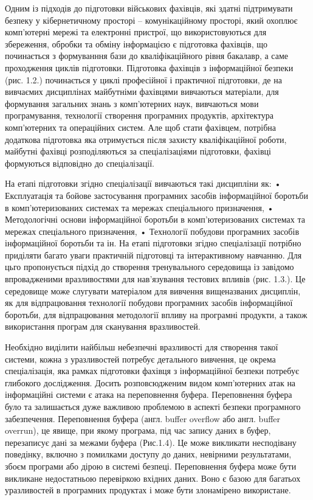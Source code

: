 \documentclass[oneside,final,14pt]{extreport}
\begin{document}
Одним із підходів до підготовки військових фахівців, які здатні підтримувати безпеку у кібернетичному просторі – комунікаційному просторі, який охоплює комп’ютерні мережі та електронні пристрої, що використовуються для збереження, обробки та обміну інформацією є підготовка фахівців, що починається з формуванння бази до кваліфікаційного рівня бакалавр, а саме проходження циклів підготовки.
Підготовка фахівців з інформаційної безпеки (рис. 1.2.) починається у циклі професійної і практичної підготовки, де на вивчаємих дисциплінах майбутніми фахівцями вивчаються матеріали, для формування загальних знань з комп’ютерних наук, вивчаються мови програмування, технології створення програмних продуктів, архітектура комп’ютерних та операційних  систем. Але щоб стати фахівцем, потрібна додаткова підготовка яка отримується після захисту кваліфікаційної роботи, майбутні фахівці розподіляються за спеціалізаціями підготовки, фахівці формуються відповідно до спеціалізації.

На етапі підготовки згідно спеціалізації вивчаються такі дисципліни як:
•   Експлуатація та бойове застосування програмних засобів інформаційної боротьби в комп’ютеризованих системах та мережах спеціального призначення,
•    Методологічні основи інформаційної боротьби в комп’ютеризованих системах та мережах спеціального призначення,
•   Технології побудови програмних засобів інформаційної боротьби та ін.
На етапі підготовки згідно спеціалізації потрібно приділяти багато уваги практичній підготовці та інтерактивному навчанню. Для цьго пропонується підхід до створення тренувального середовища із завідомо впровадженими вразливостями для нав’язування тестових впливів (рис. 1.3.). Це середовище може слугувати матеріалом для вивчення вищеназваних дисциплін, як для відпрацювання технології побудови програмних засобів інформаційної боротьби,  для відпрацювання методології впливу на програмні продукти, а також використання програм для сканування вразливостей.

Необхідно виділити найбільш небезпечні вразливості для створення такої системи, кожна з уразливостей потребує детального вивчення, це окрема спеціалізація,  яка рамках підготовки фахівця з інформаційної безпеки потребує глибокого дослідження.
Досить розповсюдженим видом комп'ютерних атак на інформаційні системи є атака на переповнення буфера.
Переповнення буфера було та залишається дуже важливою проблемою в аспекті безпеки програмного забезпечення. Переповнення буфера (англ. buffer overflow або англ. buffer overrun), це явище, при якому програма, під час запису даних в буфер, перезаписує дані за межами буфера (Рис.1.4). Це може викликати несподівану поведінку, включно з помилками доступу до даних, невірними результатами, збоєм програми або дірою в системі безпеці.
Переповнення буфера може бути викликане недостатньою перевіркою вхідних даних. Воно є базою для багатьох уразливостей в програмних продуктах і може бути злонамірено використане.
\end{document}
